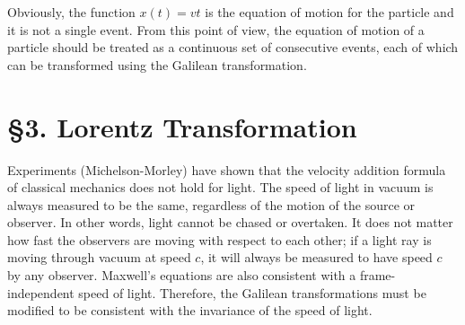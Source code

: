 \documentclass[12pt]{article}
\begin{document}
Obviously, the function $x(t)=vt$ is the equation of motion for the particle and it is not a single event. From this point of view, the equation of motion of a particle should be treated as a continuous set of consecutive events, each of which can be transformed using the Galilean transformation. 

\section*{§3. Lorentz Transformation}

Experiments (Michelson-Morley) have shown that the velocity addition formula of classical mechanics does not hold for light. The speed of light in vacuum is always measured to be the same, regardless of the motion of the source or observer. In other words, light cannot be chased or overtaken. It does not matter how fast the observers are moving with respect to each other; if a light ray is moving through vacuum at speed $c$, it will always be measured to have speed $c$ by any observer. Maxwell's equations are also consistent with a frame-independent speed of light. Therefore, the Galilean transformations must be modified to be consistent with the invariance of the speed of light.
\end{document}
